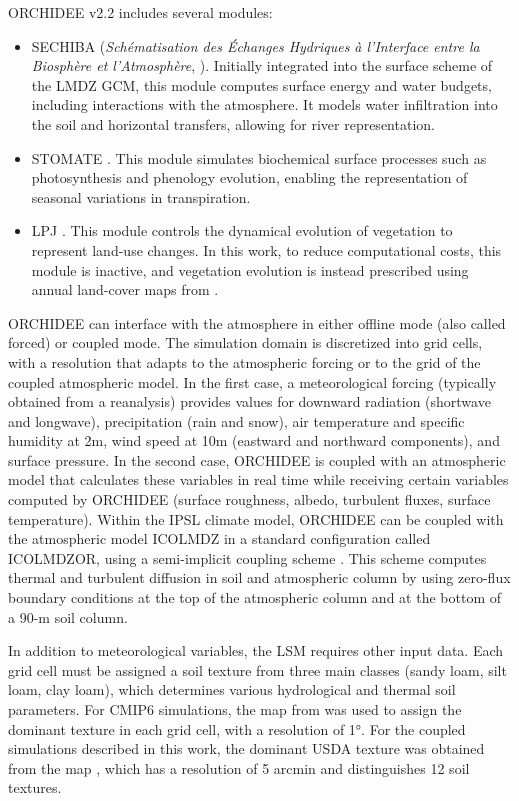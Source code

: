ORCHIDEE v2.2 includes several modules:
\begin{itemize}
    \item SECHIBA (\textit{Schématisation des Échanges Hydriques à l’Interface entre la Biosphère et l’Atmosphère}, \cite{ducoudre_sechiba_1993}). Initially integrated into the surface scheme of the LMDZ GCM, this module computes surface energy and water budgets, including interactions with the atmosphere. It models water infiltration into the soil and horizontal transfers, allowing for river representation.
    \item STOMATE \citep{krinner_dynamic_2005}. This module simulates biochemical surface processes such as photosynthesis and phenology evolution, enabling the representation of seasonal variations in transpiration.
    \item LPJ \citep{sitch_evaluation_2003}. This module controls the dynamical evolution of vegetation to represent land-use changes. In this work, to reduce computational costs, this module is inactive, and vegetation evolution is instead prescribed using annual land-cover maps from \citet{belward1999igbp}.%
\end{itemize}

ORCHIDEE can interface with the atmosphere in either offline mode (also called forced) or coupled mode. The simulation domain is discretized into grid cells, with a resolution that adapts to the atmospheric forcing or to the grid of the coupled atmospheric model.
In the first case, a meteorological forcing (typically obtained from a reanalysis) provides values for downward radiation (shortwave and longwave), precipitation (rain and snow), air temperature and specific humidity at 2m, wind speed at 10m (eastward and northward components), and surface pressure. 
In the second case, ORCHIDEE is coupled with an atmospheric model that calculates these variables in real time while receiving certain variables computed by ORCHIDEE (surface roughness, albedo, turbulent fluxes, surface temperature).
Within the IPSL climate model, ORCHIDEE can be coupled with the atmospheric model ICOLMDZ in a standard configuration called ICOLMDZOR, using a semi-implicit coupling scheme \citep{polcher_proposal_1998}. This scheme computes thermal and turbulent diffusion in soil and atmospheric column by using zero-flux boundary conditions at the top of the atmospheric column and at the bottom of a 90-m soil column.

In addition to meteorological variables, the LSM requires other input data. Each grid cell must be assigned a soil texture from three main classes (sandy loam, silt loam, clay loam), which determines various hydrological and thermal soil parameters. 
For CMIP6 simulations, the map from \citet{zobler87802world} was used to assign the dominant texture in each grid cell, with a resolution of 1°. For the coupled simulations described in this work, the dominant USDA texture was obtained from the map \citet{reynolds_estimating_2000}, which has a resolution of 5 arcmin and distinguishes 12 soil textures.

